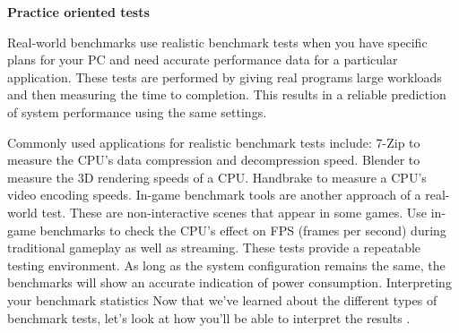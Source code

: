 \noindent \textbf{Practice oriented tests}

Real-world benchmarks use realistic benchmark tests when you have specific plans for your PC and need accurate performance data for a particular application.
These tests are performed by giving real programs large workloads and then measuring the time to completion. This results in a reliable prediction of system performance using the same settings.

Commonly used applications for realistic benchmark tests include:
7-Zip to measure the CPU's data compression and decompression speed.
Blender to measure the 3D rendering speeds of a CPU.
Handbrake to measure a CPU's video encoding speeds.
In-game benchmark tools are another approach of a real-world test. These are non-interactive scenes that appear in some games. Use in-game benchmarks to check the CPU's effect on FPS (frames per second) during traditional gameplay as well as streaming.
These tests provide a repeatable testing environment. As long as the system configuration remains the same, the benchmarks will show an accurate indication of power consumption. 
Interpreting your benchmark statistics
Now that we've learned about the different types of benchmark tests, let's look at how you'll be able to interpret the results \cite{Anovervi34:online}.


